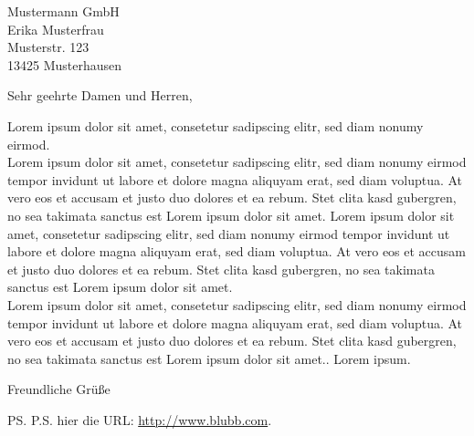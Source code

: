 \documentclass[firstfoot=false]{scrlttr2}
\begin{document}
\begin{letter}{Mustermann GmbH \\ Erika Musterfrau \\ Musterstr. 123 \\ 13425 Musterhausen}

\opening{Sehr geehrte Damen und Herren,}

Lorem ipsum dolor sit amet, consetetur sadipscing elitr, sed diam nonumy eirmod.\\

Lorem ipsum dolor sit amet, consetetur sadipscing elitr, sed diam nonumy eirmod tempor invidunt ut labore et dolore magna aliquyam erat, sed diam voluptua. At vero eos et accusam et justo duo dolores et ea rebum. Stet clita kasd gubergren, no sea takimata sanctus est Lorem ipsum dolor sit amet. Lorem ipsum dolor sit amet, consetetur sadipscing elitr, sed diam nonumy eirmod tempor invidunt ut labore et dolore magna aliquyam erat, sed diam voluptua. At vero eos et accusam et justo duo dolores et ea rebum. Stet clita kasd gubergren, no sea takimata sanctus est Lorem ipsum dolor sit amet.\\

Lorem ipsum dolor sit amet, consetetur sadipscing elitr, sed diam nonumy eirmod tempor invidunt ut labore et dolore magna aliquyam erat, sed diam voluptua. At vero eos et accusam et justo duo dolores et ea rebum. Stet clita kasd gubergren, no sea takimata sanctus est Lorem ipsum dolor sit amet..
Lorem ipsum.

\closing{Freundliche Grüße}
\ps{P.S. hier die URL: \url{http://www.blubb.com}.}

\end{letter}
\end{document}
